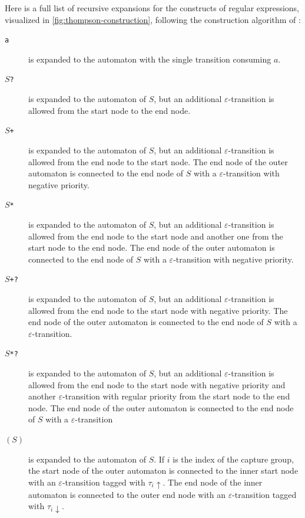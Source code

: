 \documentclass[english]{sigplanconf}
\theoremstyle{definition}
\begin{document}
Here is a full list of recursive expansions for the constructs 
of regular expressions, visualized in \ref{fig:thompson-construction},
following the construction algorithm of \cite{Thom68a}:
\begin{description}
\item[\texttt{a}] is expanded to the automaton with the single transition consuming $a$.
\item[\texttt{$S$?}] is expanded to the automaton of $S$, but an additional $\varepsilon$-transition is allowed from the start node to the end node.
\item[\texttt{$S$+}]  is expanded to the automaton of $S$, but an additional $\varepsilon$-transition is allowed from the end node to the start node. The end node of the outer automaton is connected to the end node of $S$ with a $\varepsilon$-transition with negative priority.
\item[\texttt{$S$*}]  is expanded to the automaton of $S$, but an additional $\varepsilon$-transition is allowed from the end node to the start node and another one from the start node to the end node. The end node of the outer automaton is connected to the end node of $S$ with a $\varepsilon$-transition with negative priority.
\item[\texttt{$S$+?}]  is expanded to the automaton of $S$, but an additional $\varepsilon$-transition is allowed from the end node to the start node with negative priority. The end node of the outer automaton is connected to the end node of $S$ with a $\varepsilon$-transition.
\item[\texttt{$S$*?}]  is expanded to the automaton of $S$, but an additional $\varepsilon$-transition is allowed from the end node to the start node with negative priority and another  $\varepsilon$-transition with regular priority from the start node to the end node. The end node of the outer automaton is connected to the end node of $S$ with a $\varepsilon$-transition
\item[\texttt{$(S)$}] is expanded to the automaton of $S$. If $i$ is the index of the capture group, the start node of the outer automaton is connected to the inner start node with an $\varepsilon$-transition tagged with $\tau_i\uparrow$. The end node of the inner automaton is connected to the outer end node with an $\varepsilon$-transition tagged with $\tau_i\downarrow$.
\end{description}
\end{document}
